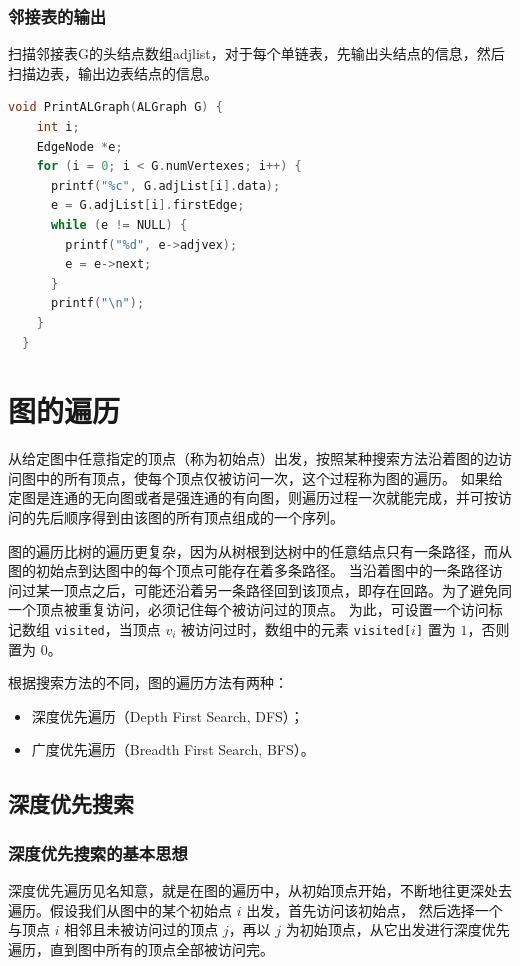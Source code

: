 \documentclass[lang=cn,newtx,10pt,scheme=chinese]{elegantbook}
\begin{document}
\subsubsection{邻接表的输出}

扫描邻接表G的头结点数组adjlist，对于每个单链表，先输出头结点的信息，然后扫描边表，输出边表结点的信息。
\begin{lstlisting}[language=C++, caption={邻接表的输出}]
  void PrintALGraph(ALGraph G) {
    int i;
    EdgeNode *e;
    for (i = 0; i < G.numVertexes; i++) {
      printf("%c", G.adjList[i].data);
      e = G.adjList[i].firstEdge;
      while (e != NULL) {
        printf("%d", e->adjvex);
        e = e->next;
      }
      printf("\n");
    }
  }
\end{lstlisting}


\section{图的遍历}
从给定图中任意指定的顶点（称为初始点）出发，按照某种搜索方法沿着图的边访问图中的所有顶点，使每个顶点仅被访问一次，这个过程称为图的遍历。
如果给定图是连通的无向图或者是强连通的有向图，则遍历过程一次就能完成，并可按访问的先后顺序得到由该图的所有顶点组成的一个序列。

图的遍历比树的遍历更复杂，因为从树根到达树中的任意结点只有一条路径，而从图的初始点到达图中的每个顶点可能存在着多条路径。
当沿着图中的一条路径访问过某一顶点之后，可能还沿着另一条路径回到该顶点，即存在回路。为了避免同一个顶点被重复访问，必须记住每个被访问过的顶点。
为此，可设置一个访问标记数组 \texttt{visited}，当顶点 $v_i$ 被访问过时，数组中的元素 \texttt{visited[$i$]} 置为 $1$，否则置为 $0$。

根据搜索方法的不同，图的遍历方法有两种：
\begin{itemize}
  \item 深度优先遍历（Depth First Search, DFS）；
  \item 广度优先遍历（Breadth First Search, BFS）。
\end{itemize}
\subsection{深度优先搜索}

\subsubsection{深度优先搜索的基本思想}
深度优先遍历见名知意，就是在图的遍历中，从初始顶点开始，不断地往更深处去遍历。假设我们从图中的某个初始点 $i$ 出发，首先访问该初始点，
然后选择一个与顶点 $i$ 相邻且未被访问过的顶点 $j$，再以 $j$ 为初始顶点，从它出发进行深度优先遍历，直到图中所有的顶点全部被访问完。
\end{document}
